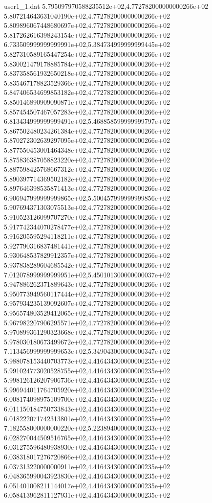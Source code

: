 \begin{filecontents}{user1_1.dat}
5.795097970588235512e+02,4.772782000000000266e+02
5.807214643631040190e+02,4.772782000000000266e+02
5.809896067448680697e+02,4.772782000000000266e+02
5.817262616398243154e+02,4.772782000000000266e+02
6.733509999999999991e+02,5.384734999999999445e+02
5.827310589165447254e+02,4.772782000000000266e+02
5.830021479178885784e+02,4.772782000000000266e+02
5.837358561932650218e+02,4.772782000000000266e+02
5.835467178823529366e+02,4.772782000000000266e+02
5.847406534699853182e+02,4.772782000000000266e+02
5.850146890909090871e+02,4.772782000000000266e+02
5.857454507467057283e+02,4.772782000000000266e+02
6.813434999999999491e+02,5.468858599999999797e+02
5.867502480234261384e+02,4.772782000000000266e+02
5.870272302639297095e+02,4.772782000000000266e+02
5.877550453001464348e+02,4.772782000000000266e+02
5.875836387058823220e+02,4.772782000000000266e+02
5.887598425768667312e+02,4.772782000000000266e+02
5.890397714369502182e+02,4.772782000000000266e+02
5.897646398535871413e+02,4.772782000000000266e+02
6.906947999999999865e+02,5.500457999999999856e+02
5.907694371303075513e+02,4.772782000000000266e+02
5.910523126099707270e+02,4.772782000000000266e+02
5.917742344070278477e+02,4.772782000000000266e+02
5.916205595294118211e+02,4.772782000000000266e+02
5.927790316837481441e+02,4.772782000000000266e+02
5.930648537829912357e+02,4.772782000000000266e+02
5.937838289604685542e+02,4.772782000000000266e+02
7.012078999999999951e+02,5.450101300000000037e+02
5.947886262371889643e+02,4.772782000000000266e+02
5.950773949560117444e+02,4.772782000000000266e+02
5.957934235139092607e+02,4.772782000000000266e+02
5.956574803529412065e+02,4.772782000000000266e+02
5.967982207906295571e+02,4.772782000000000266e+02
5.970899361290323668e+02,4.772782000000000266e+02
5.978030180673499672e+02,4.772782000000000266e+02
7.113456999999999653e+02,5.349043000000000347e+02
5.988078153440703773e+02,4.416434300000000235e+02
5.991024773020528755e+02,4.416434300000000235e+02
5.998126126207906736e+02,4.416434300000000235e+02
5.996944011764705920e+02,4.416434300000000235e+02
6.008174098975109700e+02,4.416434300000000235e+02
6.011150184750733843e+02,4.416434300000000235e+02
6.018222071742313801e+02,4.416434300000000235e+02
7.182558000000000220e+02,5.223894000000000233e+02
6.028270044509516765e+02,4.416434300000000235e+02
6.031275596480938930e+02,4.416434300000000235e+02
6.038318017276720866e+02,4.416434300000000235e+02
6.037313220000000911e+02,4.416434300000000235e+02
6.048365990043923830e+02,4.416434300000000235e+02
6.051401008211144017e+02,4.416434300000000235e+02
6.058413962811127931e+02,4.416434300000000235e+02

\end{filecontents}
